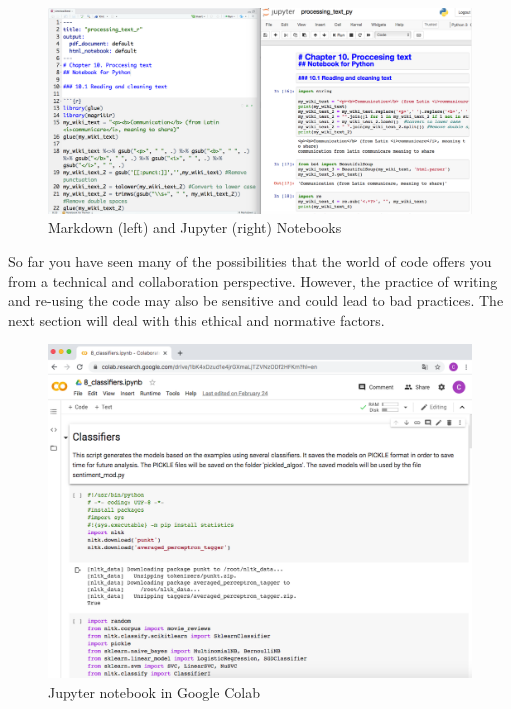 \begin{figure}
\centering
\includegraphics[width=0.9\linewidth]{figures/ch04_notebooks}
\caption{Markdown (left) and Jupyter (right) Notebooks}
\label{fig:notebooks}
\end{figure}

So far you have seen many of the possibilities that the world of code offers you from a technical and collaboration perspective. However, the practice of writing and re-using the code may also be sensitive and could lead to bad practices. The next section will deal with this ethical and normative factors.

\begin{figure}
\centering
\includegraphics[width=0.9\linewidth]{figures/ch04_colab}
\caption{Jupyter notebook in Google Colab}
\label{fig:colab}
\end{figure}
